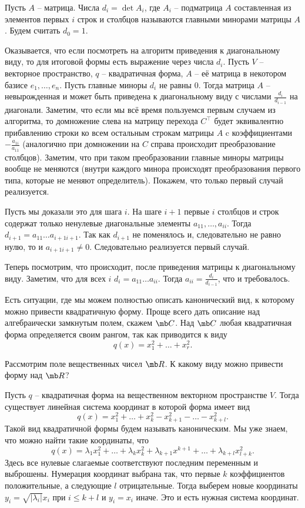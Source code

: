 \dfn Пусть $A$ -- матрица. Числа $d_i=\det A_i$, где $A_i$ -- подматрица $A$ составленная из элементов первых $i$ строк и столбцов  называются главными минорами матрицы $A$. Будем считать $d_0=1$.
\edfn


Оказывается, что если посмотреть на алгоритм приведения к диагональному виду, то для итоговой формы есть выражение через числа $d_i$.
Пусть $V$ -- векторное пространство, $q$ -- квадратичная форма, $A$ -- её матрица в некотором базисе $e_1,\dots,e_n$. Пусть главные миноры $d_i$ не равны 0. 
Тогда матрица $A$ -- невырожденная и может быть приведена к диагональному виду с числами $\frac{d_{i}}{d_{i-1}}$ на диагонали.
\proof Заметим, что если мы всё время пользуемся первым случаем из алгоритма, то домножение слева на матрицу перехода $C^{\top}$ будет эквивалентно прибавлению строки ко всем остальным строкам матрицы $A$ c коэффициентами $-\frac{a_{1i}}{a_{11}}$ (аналогично при домножении на $C$ справа происходит преобразование столбцов). Заметим, что при таком преобразовании главные миноры матрицы вообще не меняются (внутри каждого минора происходят преобразования первого типа, которые не меняют определитель). Покажем, что только первый случай реализуется. 

Пусть мы доказали это для шага $i$. На шаге $i+1$ первые $i$ столбцов и строк содержат только ненулевые диагональные элементы $a_{11},\dots, a_{ii}$. Тогда $d_{i+1}=a_{11}\dots a_{i+1 i+1}$. Так как $d_{i+1}$ не  поменялось и, следовательно не равно нулю, то и $a_{i+1 i+1} \neq 0$. Следовательно реализуется первый случай. 

Теперь посмотрим, что происходит, после приведения матрицы к диагональному виду. Заметим, что для всех $i$ $d_i=a_{11}\dots a_{ii}$. Тогда $a_{ii}=\frac{d_i}{d_{i-1}}$, что и требовалось.
\endproof
\ethrm



Есть ситуации, где мы можем полностью описать канонический вид, к которому можно привести квадратичную форму. Проще всего дать описание над алгебраически замкнутым полем, скажем $\mb C$. Над $\mb C$ любая квадратичная форма определяется своим рангом, так как приводится к виду $$q(x)=x_1^2+\dots+x_r^2.$$


Рассмотрим поле вещественных чисел $\mb R$. К какому виду можно привести форму над $\mb R$? 

\utv Пусть $q$ -- квадратичная форма на вещественном векторном пространстве $V$. Тогда существует линейная система координат в которой форма имеет вид $$q(x)= x_1^2+\dots + x_k^2 - x_{k+1}^2-\dots-x_{k+l}^2.$$
Такой вид квадратичной формы будем называть каноническим. 
\eutv
\proof Мы уже знаем, что можно найти такие координаты, что $$q(x)= \lambda_1 x_1^2+ \dots + \lambda_k x_k^2+ \lambda_{k+1} x^{k+1} + \dots + \lambda_{k+l} x_{l+k}^2.$$
Здесь все нулевые слагаемые соответствуют последним переменным и выброшены. Нумерация  координат выбрана так, что первые $k$ коэффициентов положительные, а следующие $l$ отрицательные. Тогда выберем новые координаты $y_i=\sqrt{|\lambda_i|} x_i$ при $i\leq k+l$ и $y_i=x_i$ иначе. Это и есть нужная система координат.
\endproof


